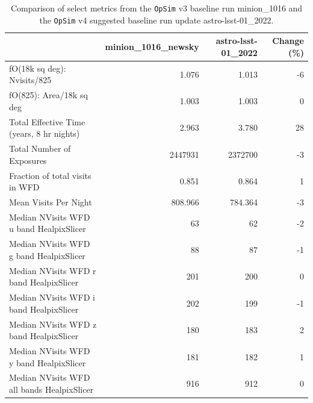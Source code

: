 \documentclass[DM,lsstdraft,authoryear,toc]{lsstdoc}
\newcommand{\opsim}{\texttt{OpSim}\xspace}
\begin{document}

\begin{table}
\caption{Comparison of select metrics from the \opsim v3 baseline run minion\_1016 and the \opsim v4 suggested baseline run update astro-lsst-01\_2022.}
\small
\begin{center}
\begin{tabular}{lrrr}
\toprule
{} &  minion\_1016\_newsky &  astro-lsst-01\_2022 &  Change (\%) \\
\midrule
fO(18k sq deg): Nvisits/825   &               1.076 &               1.013 &         -6 \\
fO(825): Area/18k sq deg     &               1.003 &               1.003 &          0 \\
Total Effective Time (years, 8 hr nights)                                         &               2.963 &               3.780 &         28 \\
Total Number of Exposures                                &             2447931 &             2372700 &         -3 \\
Fraction of total visits in WFD                      &               0.851 &               0.864 &          1 \\
Mean Visits Per Night                   &             808.966 &             784.364 &         -3 \\
Median NVisits WFD u band HealpixSlicer            &                  63 &                  62 &         -2 \\
Median NVisits WFD g band HealpixSlicer            &                  88 &                  87 &         -1 \\
Median NVisits WFD r band HealpixSlicer            &                 201 &                 200 &          0 \\
Median NVisits WFD i band HealpixSlicer            &                 202 &                 199 &         -1 \\
Median NVisits WFD z band HealpixSlicer            &                 180 &                 183 &          2 \\
Median NVisits WFD y band HealpixSlicer            &                 181 &                 182 &          1 \\
Median NVisits WFD all bands HealpixSlicer         &                 916 &                 912 &          0 \\

\end{tabular}
\end{center}
\end{table}
\end{document}
